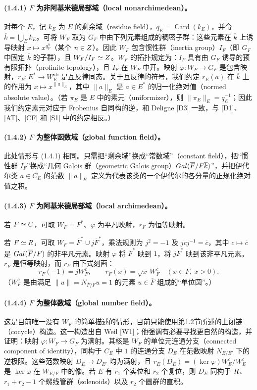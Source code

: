 \paragraph*{(1.4.1) $F$ 为非阿基米德局部域（local nonarchimedean）。}
对每个 $E$，记 $k_E$ 为 $E$ 的剩余域（residue field），$q_E=\operatorname{Card}(k_E)$，并令 $\overline k=\bigcup_E k_E$。可将 $W_F$ 取为 $G_F$ 中由下列元素组成的稠密子群：这些元素在 $\overline k$ 上诱导映射 $x\mapsto x^{q_F^n}$（某个 $n\in Z$）。因此 $W_F$ 包含惯性群（inertia group）$I_F$（即 $G_F$ 中固定 $\overline k$ 的子群），且 $W_F/I_F\simeq Z$。$W_F$ 的拓扑规定为：$I_F$ 具有由 $G_F$ 诱导的预有限拓扑（profinite topology），且 $I_F$ 在 $W_F$ 中开。映射 $\varphi:W_F\to G_F$ 是包含映射，$r_E:E^*\to W_E^{\mathrm{ab}}$ 是互反律同态。关于互反律的符号，我们约定 $r_E(a)$ 在 $\overline k$ 上的作用为 $x\mapsto x^{\lVert a\rVert_E}$，其中 $\lVert a\rVert_E$ 是 $a\in E^*$ 的归一化绝对值（normed absolute value）。（若 $\pi_E$ 是 $E$ 中的素元（uniformizer），则 $\lVert\pi_E\rVert_E=q_E^{-1}$；因此我们约定素元对应于 Frobenius 自同构的逆，和 Deligne [D3] 一致，与 [D1]、[AT]、[CF] 和 [S1] 中的约定相反。）

\paragraph*{(1.4.2) $F$ 为整体函数域（global function field）。}
此处情形与 (1.4.1) 相同。只需把“剩余域”换成“常数域”（constant field），把“惯性群 $I_F$”换成“几何 Galois 群（geometric Galois group）$Gal(\overline F/F\overline k)$”，并把伊代尔类 $a\in C_E$ 的范数 $\lVert a\rVert_E$ 定义为代表该类的一个伊代尔的各分量的正规化绝对值之积。

\paragraph*{(1.4.3) $F$ 为阿基米德局部域（local archimedean）。}
若 $F\simeq C$，可取 $W_F=F^*$、$\varphi$ 为平凡映射，$r_F$ 为恒等映射。

若 $F\simeq R$，可取 $W_F=\overline F^*\cup j\overline F^*$，乘法规则为 $j^2=-1$ 及 $jcj^{-1}=\overline c$，其中 $c\mapsto\overline c$ 是 $Gal(\overline F/F)$ 的非平凡元素。映射 $\varphi$ 将 $\overline F^*$ 映到 $1$，将 $j\overline F^*$ 映到该非平凡元素。$r_{\overline F}$ 是恒等映射，而 $r_F$ 由下式刻画：
\[
 r_F(-1)=jW_F^c,\qquad
 r_F(x)=\sqrt{x}\,W_F^c\quad(x\in F,\ x>0).
\]
（$W_F^c$ 是由满足 $\lVert u\rVert=N_{\overline F/F}u=1$ 的元素 $u\in\overline F$ 组成的“单位圆”。）

\paragraph*{(1.4.4) $F$ 为整体数域（global number field）。}
这是目前唯一没有 $W_F$ 的简单描述的情形，目前只能使用第1.2节所述的上闭链（cocycle）构造。这一构造出自 Weil [W1]；他强调有必要寻找更自然的构造，并证明：映射 $\varphi:W_F\to G_F$ 为满射。其核是 $W_F$ 的单位元连通分支（connected component of identity），同构于 $C_E$ 中 $1$ 的连通分支 $D_E$ 在范数映射 $N_{E/E'}$ 下的逆极限。这些范数映射 $D_E\to D_{E'}$ 均为满射，且 $r_E(D_E)=(\ker\varphi)W_E^c/W_E^c$ 是 $\ker\varphi$ 在 $W_{E/F}$ 中的像。若 $E$ 有 $r_1$ 个实位和 $r_2$ 个复位，则 $D_E$ 同构于 $R$、$r_1+r_2-1$ 个螺线管群（solenoids）以及 $r_2$ 个圆群的直积。

